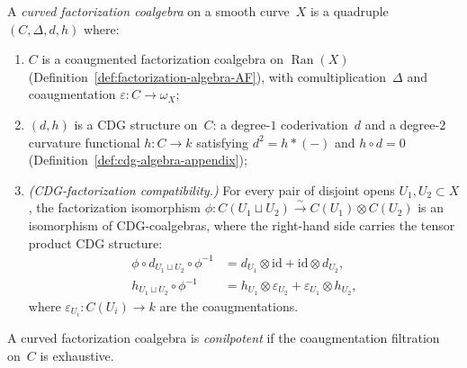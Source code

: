 \begin{definition}
\label{def:curved-fact-coalgebra}
A \emph{curved factorization coalgebra} on a smooth curve~$X$
is a quadruple $(C, \Delta, d, h)$ where:
\begin{enumerate}[label=\textup{(\roman*)}]
\item $C$ is a coaugmented factorization coalgebra on
  $\operatorname{Ran}(X)$
  (Definition~\ref{def:factorization-algebra-AF}), with
  comultiplication~$\Delta$ and coaugmentation
  $\varepsilon \colon C \to \omega_X$;
\item $(d, h)$ is a CDG structure on~$C$: a degree-$1$
  coderivation~$d$ and a degree-$2$ curvature functional
  $h \colon C \to k$ satisfying $d^2 = h \ast (-)$ and
  $h \circ d = 0$
  (Definition~\ref{def:cdg-algebra-appendix});
\item \emph{(CDG-factorization compatibility.)}
  For every pair of disjoint opens $U_1, U_2 \subset X$, the
  factorization isomorphism
  $\phi \colon C(U_1 \sqcup U_2) \xrightarrow{\;\sim\;}
  C(U_1) \otimes C(U_2)$
  is an isomorphism of CDG-coalgebras, where the right-hand
  side carries the tensor product CDG structure:
  \begin{equation}\label{eq:CDG-factorization-compatibility}
  \begin{aligned}
  \phi \circ d_{U_1 \sqcup U_2} \circ \phi^{-1}
  &= d_{U_1} \otimes \mathrm{id}
  + \mathrm{id} \otimes d_{U_2}, \\
  h_{U_1 \sqcup U_2} \circ \phi^{-1}
  &= h_{U_1} \otimes \varepsilon_{U_2}
  + \varepsilon_{U_1} \otimes h_{U_2},
  \end{aligned}
  \end{equation}
  where $\varepsilon_{U_i} \colon C(U_i) \to k$ are the
  coaugmentations.
\end{enumerate}
A curved factorization coalgebra is \emph{conilpotent} if
the coaugmentation filtration on~$C$ is exhaustive.
\end{definition}

